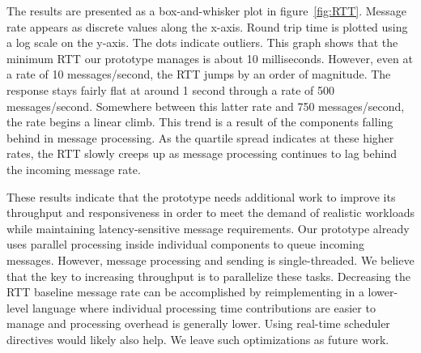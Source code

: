 The results are presented as a box-and-whisker plot in
figure~\ref{fig:RTT}. Message rate appears as discrete values along
the x-axis. Round trip time is plotted using a log scale on the
y-axis. The dots indicate outliers. This graph shows that the minimum
RTT our prototype manages is about 10 milliseconds. However, even at a
rate of 10 messages/second, the RTT jumps by an order of
magnitude. The response stays fairly flat at around 1 second through a
rate of 500 messages/second. Somewhere between this latter rate and
750 messages/second, the rate begins a linear climb.  This trend is a
result of the \name components falling behind in message processing.
As the quartile spread indicates at these higher rates, the RTT slowly
creeps up as message processing continues to lag behind the incoming
message rate.

These results indicate that the prototype needs additional work to
improve its throughput and responsiveness in order to meet the demand
of realistic workloads while maintaining latency-sensitive message
requirements.  Our prototype already uses parallel processing inside
individual components to queue incoming messages.  However, message
processing and sending is single-threaded.  We believe that the key to
increasing throughput is to parallelize these tasks. Decreasing the
RTT baseline message rate can be accomplished by reimplementing
\name in a lower-level language where individual processing time
contributions are easier to manage and processing overhead is
generally lower.  Using real-time scheduler directives would likely
also help. We leave such optimizations as future work.


